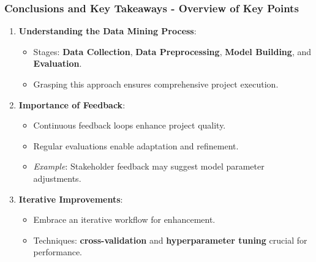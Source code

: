 \documentclass[aspectratio=169]{beamer}
\begin{document}
\begin{frame}[fragile]
    \frametitle{Conclusions and Key Takeaways - Overview of Key Points}
    \begin{enumerate}
        \item \textbf{Understanding the Data Mining Process}:
        \begin{itemize}
            \item Stages: \textbf{Data Collection}, \textbf{Data Preprocessing}, \textbf{Model Building}, and \textbf{Evaluation}.
            \item Grasping this approach ensures comprehensive project execution.
        \end{itemize}
        
        \item \textbf{Importance of Feedback}:
        \begin{itemize}
            \item Continuous feedback loops enhance project quality.
            \item Regular evaluations enable adaptation and refinement.
            \item \textit{Example}: Stakeholder feedback may suggest model parameter adjustments.
        \end{itemize}
        
        \item \textbf{Iterative Improvements}:
        \begin{itemize}
            \item Embrace an iterative workflow for enhancement.
            \item Techniques: \textbf{cross-validation} and \textbf{hyperparameter tuning} crucial for performance.
        \end{itemize}
    \end{enumerate}
\end{frame}
\end{document}
